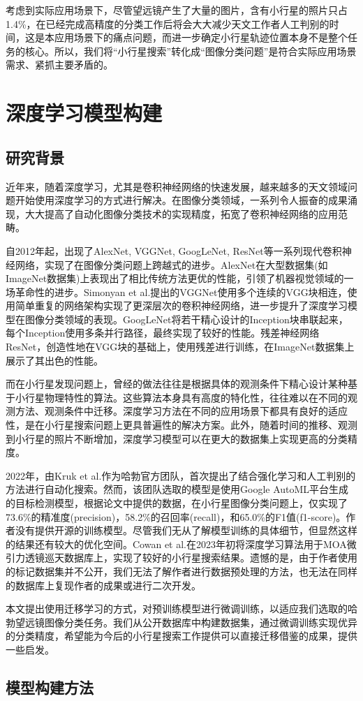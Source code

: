 \documentclass[12pt,a4paper]{article}%
\begin{document}
考虑到实际应用场景下，尽管望远镜产生了大量的图片，含有小行星的照片只占1.4\%，在已经完成高精度的分类工作后将会大大减少天文工作者人工判别的时间，这是本应用场景下的痛点问题，而进一步确定小行星轨迹位置本身不是整个任务的核心。所以，我们将“小行星搜索”转化成“图像分类问题”是符合实际应用场景需求、紧抓主要矛盾的。

\section{深度学习模型构建}

\subsection{研究背景}

近年来，随着深度学习，尤其是卷积神经网络的快速发展，越来越多的天文领域问题开始使用深度学习的方式进行解决。在图像分类领域，一系列令人振奋的成果涌现，大大提高了自动化图像分类技术的实现精度，拓宽了卷积神经网络的应用范畴。

自2012年起，出现了AlexNet, VGGNet, GoogLeNet, ResNet等一系列现代卷积神经网络，实现了在图像分类问题上跨越式的进步。AlexNet在大型数据集(如ImageNet数据集)上表现出了相比传统方法更优的性能，引领了机器视觉领域的一场革命性的进步。Simonyan et al.提出的VGGNet使用多个连续的VGG块相连，使用简单重复的网络架构实现了更深层次的卷积神经网络，进一步提升了深度学习模型在图像分类领域的表现。GoogLeNet将若干精心设计的Inception块串联起来，每个Inception使用多条并行路径，最终实现了较好的性能。残差神经网络ResNet，创造性地在VGG块的基础上，使用残差进行训练，在ImageNet数据集上展示了其出色的性能。

而在小行星发现问题上，曾经的做法往往是根据具体的观测条件下精心设计某种基于小行星物理特性的算法。这些算法本身具有高度的特化性，往往难以在不同的观测方法、观测条件中迁移。深度学习方法在不同的应用场景下都具有良好的适应性，是在小行星搜索问题上更具普遍性的解决方案。此外，随着时间的推移、观测到小行星的照片不断增加，深度学习模型可以在更大的数据集上实现更高的分类精度。

2022年，由Kruk et al.作为哈勃官方团队，首次提出了结合强化学习和人工判别的方法进行自动化搜索。然而，该团队选取的模型是使用Google AutoML平台生成的目标检测模型，根据论文中提供的数据，在小行星图像分类问题上，仅实现了73.6\%的精准度(precision)，58.2\%的召回率(recall)，和65.0\%的F1值(f1-score)。作者没有提供开源的训练模型。尽管我们无从了解模型训练的具体细节，但显然这样的结果还有较大的优化空间。Cowan et al.在2023年初将深度学习算法用于MOA微引力透镜巡天数据库上，实现了较好的小行星搜索结果。遗憾的是，由于作者使用的标记数据集并不公开，我们无法了解作者进行数据预处理的方法，也无法在同样的数据库上复现作者的成果或进行二次开发。

本文提出使用迁移学习的方式，对预训练模型进行微调训练，以适应我们选取的哈勃望远镜图像分类任务。我们从公开数据库中构建数据集，通过微调训练实现优异的分类精度，希望能为今后的小行星搜索工作提供可以直接迁移借鉴的成果，提供一些启发。

\subsection{模型构建方法}




\newpage



\end{document}
